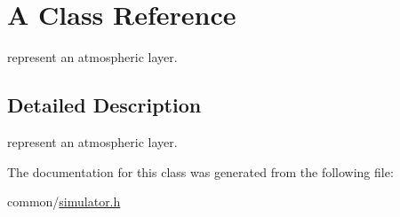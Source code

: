 \hypertarget{classA}{
\section{A Class Reference}
\label{classA}
}


represent an atmospheric layer.  




\subsection{Detailed Description}
represent an atmospheric layer. 

The documentation for this class was generated from the following file:\begin{DoxyCompactItemize}
\item 
common/\hyperlink{simulator_8h}{simulator.h}\end{DoxyCompactItemize}
